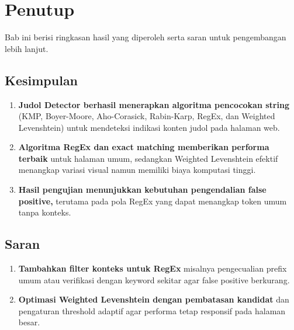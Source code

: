 \section{Penutup}

Bab ini berisi ringkasan hasil yang diperoleh serta saran untuk pengembangan
lebih lanjut.

\subsection{Kesimpulan}

\begin{enumerate}
	\item \textbf{Judol Detector berhasil menerapkan algoritma pencocokan string}
	(KMP, Boyer-Moore, Aho-Corasick, Rabin-Karp, RegEx, dan Weighted Levenshtein)
	untuk mendeteksi indikasi konten judol pada halaman web.
	\item \textbf{Algoritma RegEx dan exact matching memberikan performa terbaik}
	untuk halaman umum, sedangkan Weighted Levenshtein efektif menangkap
	variasi visual namun memiliki biaya komputasi tinggi.
	\item \textbf{Hasil pengujian menunjukkan kebutuhan pengendalian false positive,}
	terutama pada pola RegEx yang dapat menangkap token umum tanpa konteks.
\end{enumerate}

\subsection{Saran}

\begin{enumerate}
	\item \textbf{Tambahkan filter konteks untuk RegEx} misalnya pengecualian
	prefix umum atau verifikasi dengan keyword sekitar agar false positive
	berkurang.
	\item \textbf{Optimasi Weighted Levenshtein dengan pembatasan kandidat} dan
	pengaturan threshold adaptif agar performa tetap responsif pada halaman besar.
\end{enumerate}
